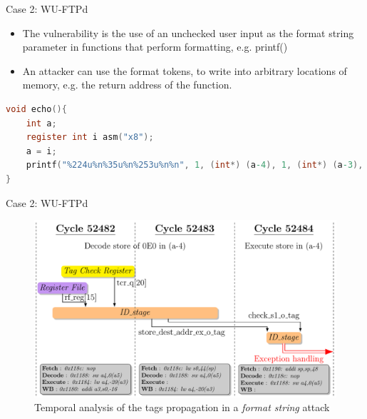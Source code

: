 \begin{frame}{Case 2: WU-FTPd}
    \begin{itemize}
        \justifying
        \item The vulnerability is the use of an unchecked user input as the format string parameter in functions that perform formatting, e.g. printf()
        \item An attacker can use the format tokens, to write into arbitrary locations of memory, e.g. the return address of the function.
    \end{itemize}

    \centering
    \begin{minipage}[c]{\textwidth}
        \begin{lstlisting}[language=C,label=code:printfNFormat]
void echo(){
    int a;
    register int i asm("x8");
    a = i;
    printf("%224u%n%35u%n%253u%n%n", 1, (int*) (a-4), 1, (int*) (a-3), 1, (int*) (a-2), (int*) (a-1));
}\end{lstlisting}
    \end{minipage}
\end{frame}

\begin{frame}[noframenumbering]{Case 2: WU-FTPd}
    \begin{figure}
        \centering
        \includegraphics[height=.85\textheight]{src/2_vuln_assessment/img/wuftpd/ftpd_short.pdf}
        \caption{Temporal analysis of the tags propagation in a \textit{format string} attack}
        \label{fig:analyseTempoFormatString}
    \end{figure}
\end{frame}

